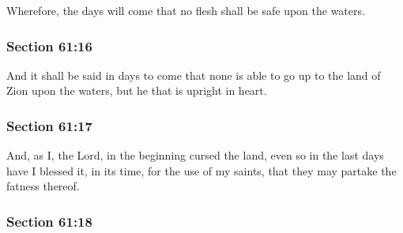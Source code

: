 		Wherefore, the days will come that no flesh shall be safe upon the waters.


	\subsubsection{Section 61:16} %
		\label{DC61-16}

		And it shall be said in days to come that none is able to go up to the land of Zion upon the waters, but he that is upright in heart.


	\subsubsection{Section 61:17} %
		\label{DC61-17}

		And, as I, the Lord, in the beginning cursed the land, even so in the last days have I blessed it, in its time, for the use of my saints, that they may partake the fatness thereof.


	\subsubsection{Section 61:18} %
		\label{DC61-18}

